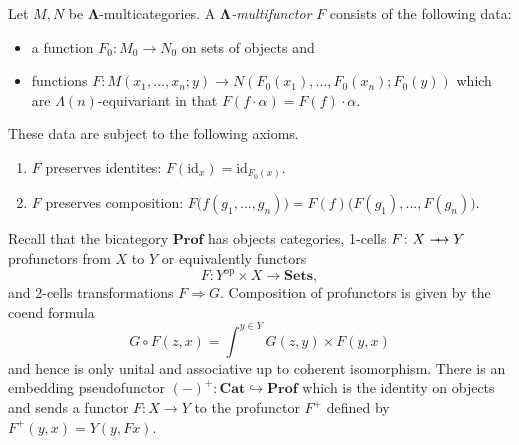 \documentclass{amsbook} %
\newcommand{\mb}{\mathbf}
\newcommand{\id}{\textrm{id}}
\def\srarrow{\relbar\joinrel\mapstochar\joinrel\rightarrow}
\numberwithin{section}{chapter}
\begin{document}
\begin{Defi}
Let $M, N$ be $\mb{\Lambda}$-multicategories.  A \emph{$\mb{\Lambda}$-multifunctor} $F$ consists of the following data:
\begin{itemize}
\item a function $F_{0} \colon M_{0} \to N_{0}$ on sets of objects and
\item functions $F \colon M(x_1, \ldots, x_n; y) \to N(F_{0}(x_1), \ldots, F_{0}(x_n); F_{0}(y))$ which are $\Lambda(n)$-equivariant in that $F(f \cdot \alpha) = F(f) \cdot \alpha$.
\end{itemize}
These data are subject to the following axioms.
\begin{enumerate}
\item $F$ preserves identites: $F(\id_x) = \id_{F_{0}(x)}$.
\item $F$ preserves composition: $F\Big( f(g_1, \ldots, g_n) \Big) = F(f) \Big( F(g_1), \ldots, F(g_n) \Big).$
\end{enumerate}
\end{Defi}



Recall that the bicategory $\mb{Prof}$ has objects categories, 1-cells $F \colon X \srarrow Y$ profunctors from $X$ to $Y$ or equivalently functors
\[
F \colon Y^{\textrm{op}} \times X \rightarrow \mb{Sets},
\]
and 2-cells transformations $F \Rightarrow G$.  Composition of profunctors is given by the coend formula
\[
G \circ F (z,x) = \int^{y \in Y} G(z,y) \times F(y,x)
\]
and hence is only unital and associative up to coherent isomorphism.  There is an embedding pseudofunctor $(-)^{+} \colon  \mb{Cat} \hookrightarrow \mb{Prof}$ which is the identity on objects and sends a functor $F \colon X \to Y$ to the profunctor $F^{+}$ defined by $F^{+}(y,x) = Y(y,Fx)$.
\end{document}
